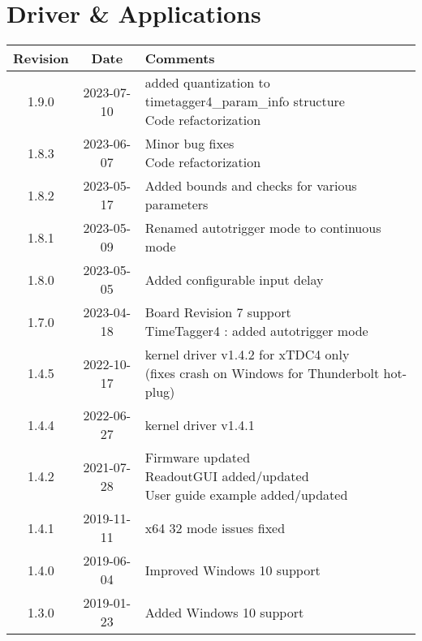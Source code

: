 \section{Driver \& Applications} \label{sec:rev_driver_applications}
\begin{tabularx}{\textwidth}{|c|c|X|}
    \hline
    Revision & Date & Comments\\
    \hline\hline
    \hline
    \hypertarget{drvrev}{1.9.0} & 2023-07-10 &
    \makecell[l] {
       added quantization to timetagger4\_param\_info structure \\*
       Code refactorization\\*   
    }\\   
    \hline
    {1.8.3} & 2023-06-07 &
    \makecell[l] {
        Minor bug fixes\\*
        Code refactorization\\*        
    }\\
    \hline
    {1.8.2} & 2023-05-17 &
    \makecell[l] {
        Added bounds and checks for various parameters\\*         
    }\\
    \hline
    {1.8.1} & 2023-05-09 &
    \makecell[l] {
     Renamed autotrigger mode to continuous mode  \\*  
    }\\
    \hline
    {1.8.0} & 2023-05-05 &
    \makecell[l] {
        Added configurable input delay\\*
    }\\
    \hline
    {1.7.0} & 2023-04-18 &
    \makecell[l] {
        Board Revision 7 support\\* 
        TimeTagger4 : added autotrigger mode\\*
    }\\
    \hline
    {1.4.5} & 2022-10-17 &
    \makecell[l] {
        kernel driver v1.4.2 for xTDC4 only\\* 
        (fixes crash on Windows for Thunderbolt hot-plug)\\*
    }\\
    \hline
    {1.4.4} & 2022-06-27 &
        kernel driver v1.4.1\\
    \hline
    1.4.2 & 2021-07-28 &
    \makecell[l]{
        Firmware updated \\*
        ReadoutGUI added/updated \\*
        User guide example added/updated \\*
    }\\
    \hline
    {1.4.1} & 2019-11-11 & x64 32 mode issues fixed\\
    \hline
    {1.4.0} & 2019-06-04 & Improved Windows 10 support\\
    \hline
    {1.3.0} & 2019-01-23 & Added Windows 10 support\\
    \hline
\end{tabularx}